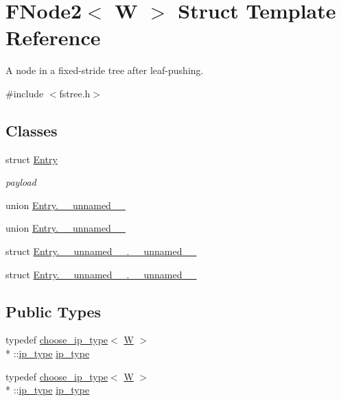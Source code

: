 \hypertarget{structFNode2}{\section{F\-Node2$<$ W $>$ Struct Template Reference}
\label{structFNode2}
}


A node in a fixed-\/stride tree after leaf-\/pushing.  




{\ttfamily \#include $<$fstree.\-h$>$}

\subsection*{Classes}
\begin{DoxyCompactItemize}
\item 
struct \hyperlink{structFNode2_1_1Entry}{Entry}
\begin{DoxyCompactList}\small\item\em payload \end{DoxyCompactList}\item 
union \hyperlink{structFNode2_unionFNode2_1_1Entry_8____unnamed____}{Entry.\-\_\-\-\_\-unnamed\-\_\-\-\_\-}
\item 
union \hyperlink{structFNode2_unionFNode2_1_1Entry_8____unnamed____}{Entry.\-\_\-\-\_\-unnamed\-\_\-\-\_\-}
\item 
struct \hyperlink{structFNode2_structFNode2_1_1Entry_8____unnamed_____8____unnamed____}{Entry.\-\_\-\-\_\-unnamed\-\_\-\-\_\-.\-\_\-\-\_\-unnamed\-\_\-\-\_\-}
\item 
struct \hyperlink{structFNode2_structFNode2_1_1Entry_8____unnamed_____8____unnamed____}{Entry.\-\_\-\-\_\-unnamed\-\_\-\-\_\-.\-\_\-\-\_\-unnamed\-\_\-\-\_\-}
\end{DoxyCompactItemize}
\subsection*{Public Types}
\begin{DoxyCompactItemize}
\item 
typedef \hyperlink{types_8h_structchoose__ip__type}{choose\-\_\-ip\-\_\-type}$<$ \hyperlink{test__u128_8cpp_ab21b528bc38899d04d3a7053e52fb797}{W} $>$\\*
\-::\hyperlink{structFNode2_ab28e88113ab341b42bc43259be0f7dd5}{ip\-\_\-type} \hyperlink{structFNode2_ab28e88113ab341b42bc43259be0f7dd5}{ip\-\_\-type}
\item 
typedef \hyperlink{types_8h_structchoose__ip__type}{choose\-\_\-ip\-\_\-type}$<$ \hyperlink{test__u128_8cpp_ab21b528bc38899d04d3a7053e52fb797}{W} $>$\\*
\-::\hyperlink{structFNode2_ab28e88113ab341b42bc43259be0f7dd5}{ip\-\_\-type} \hyperlink{structFNode2_ab28e88113ab341b42bc43259be0f7dd5}{ip\-\_\-type}
\end{DoxyCompactItemize}
